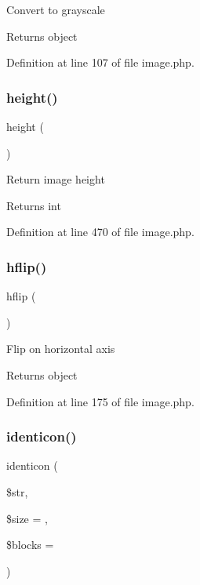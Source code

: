 Convert to grayscale \begin{DoxyReturn}{Returns}
object 
\end{DoxyReturn}


Definition at line 107 of file image.\+php.

\hypertarget{class_image_a40c074d7d21447265a9ce46470c94414}{}\label{class_image_a40c074d7d21447265a9ce46470c94414} 
\subsubsection{\texorpdfstring{height()}{height()}}
{\footnotesize\ttfamily height (\begin{DoxyParamCaption}{ }\end{DoxyParamCaption})}

Return image height \begin{DoxyReturn}{Returns}
int 
\end{DoxyReturn}


Definition at line 470 of file image.\+php.

\hypertarget{class_image_a24dbd95e2d9306a1bfe43cc344b8af1d}{}\label{class_image_a24dbd95e2d9306a1bfe43cc344b8af1d} 
\subsubsection{\texorpdfstring{hflip()}{hflip()}}
{\footnotesize\ttfamily hflip (\begin{DoxyParamCaption}{ }\end{DoxyParamCaption})}

Flip on horizontal axis \begin{DoxyReturn}{Returns}
object 
\end{DoxyReturn}


Definition at line 175 of file image.\+php.

\hypertarget{class_image_a21a211586a8f97991d047e17b1b886e2}{}\label{class_image_a21a211586a8f97991d047e17b1b886e2} 
\subsubsection{\texorpdfstring{identicon()}{identicon()}}
{\footnotesize\ttfamily identicon (\begin{DoxyParamCaption}\item[{}]{\$str,  }\item[{}]{\$size = {},  }\item[{}]{\$blocks = {} }\end{DoxyParamCaption})}

